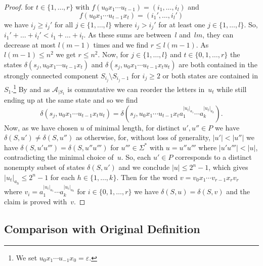 \begin{proof}
	for $t \in \{1,\ldots,r\}$ with $f(u_0 x_1 \cdots u_{t-1}) = (i_1, \ldots, i_l)$ 
	and 
	\[ 
	f(u_0 x_1 \cdots u_{t-1} x_t) = (i_1', \ldots, i_l')
	\] 
	we have $i_j \ge i_j'$ for all $j \in \{1,\ldots,l\}$
	where $i_j > i_j'$ for at least one $j \in \{1,\ldots,l\}$. 
	So, $i_1' + \ldots + i_l' < i_1 + \ldots + i_l$.
	As these sums are between~$l$ and~$lm$, they can decrease at most $l(m-1)$ times 
	and we find $r \le l(m-1)$. As $l(m-1) \le n^2$ we get $r \le n^2$. 
	Now, for $j \in \{1,\ldots,l\}$ and $t \in \{0,1,\ldots,r\}$
	the states $\delta(s_j, u_0 x_1 \cdots u_{t-1} x_t)$ and 
	$\delta(s_j, u_0 x_1 \cdots u_{t-1} x_t u_t)$ are both contained in the strongly connected component
	$S_{i_j} \setminus S_{i_j - 1}$ for $i_j \ge 2$
	or both states are contained in $S_1$.\footnote{We set $u_0 x_1 \cdots u_{-1} x_0 = \varepsilon$.}
	By 
	and as $\mathcal A_{|S_1}$ is commutative 
	we can reorder the letters in~$u_t$ while still ending up at the same state
	and so we find
	\[ 
	\delta(s_j, u_0 x_1 \cdots u_{t-1} x_t u_t) = \delta(s_j, u_0 x_1 \cdots u_{t-1} x_t a_1^{|u_t|_{a_1}} \cdots a_k^{|u_t|_{a_k}}).
	\]
	Now, as we have chosen $u$ of minimal length,
	for distinct $u',u''\in P$ we have $\delta(S, u') \ne \delta(S, u'')$
	as otherwise, for, without loss of generality, $|u'| < |u''|$
	we have $\delta(S, u'u''') = \delta(S, u'' u''')$ 
	for $u''' \in \Sigma^*$ with $u = u'' u'''$
	where $|u' u'''| < |u|$, contradicting the minimal choice of~$u$.
	So, each $u' \in P$ corresponds to a distinct nonempty subset of states $\delta(S, u')$
	and we conclude $|u| \le 2^n - 1$, which gives
	$|u_t|_{a_h} \le 2^n - 1$ for each $h \in \{1,\ldots,k\}$.
	Then for the word
	$v = v_0 x_1 \cdots v_{r-1} x_r v_r$
	where $v_i = a_1^{|u_i|_{a_1}} \cdots a_k^{|u_i|_{a_k}}$
	for $i \in \{0,1,\ldots,r\}$
	we have $\delta(S, u) = \delta(S, v)$
	and the claim is proved with~$v$.
\end{proof}

\subsection{Comparison with Original Definition}
\label{prelim:classes:sec:comparison}
	
